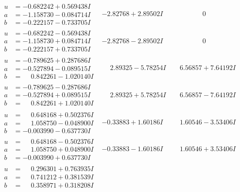 \documentclass[1p]{elsarticle_modified}
\theoremstyle{definition}
\begin{document}
$$\begin{array}{c|c|c}
\begin{aligned}
u &= -0.682242 + 0.569438 I \\
a &= -1.158730 - 0.084714 I \\
b &= -0.222157 - 0.733705 I\end{aligned}
 & -2.82768 + 2.89502 I & \phantom{-0.000000 } 0 \\ \hline\begin{aligned}
u &= -0.682242 - 0.569438 I \\
a &= -1.158730 + 0.084714 I \\
b &= -0.222157 + 0.733705 I\end{aligned}
 & -2.82768 - 2.89502 I & \phantom{-0.000000 } 0 \\ \hline\begin{aligned}
u &= -0.789625 + 0.287686 I \\
a &= -0.527894 - 0.089515 I \\
b &= \phantom{-}0.842261 - 1.020140 I\end{aligned}
 & \phantom{-}2.89325 - 5.78254 I & \phantom{-}6.56857 + 7.64192 I \\ \hline\begin{aligned}
u &= -0.789625 - 0.287686 I \\
a &= -0.527894 + 0.089515 I \\
b &= \phantom{-}0.842261 + 1.020140 I\end{aligned}
 & \phantom{-}2.89325 + 5.78254 I & \phantom{-}6.56857 - 7.64192 I \\ \hline\begin{aligned}
u &= \phantom{-}0.648168 + 0.502376 I \\
a &= \phantom{-}1.058750 - 0.048900 I \\
b &= -0.003990 - 0.637730 I\end{aligned}
 & -0.33883 + 1.60186 I & \phantom{-}1.60546 - 3.53406 I \\ \hline\begin{aligned}
u &= \phantom{-}0.648168 - 0.502376 I \\
a &= \phantom{-}1.058750 + 0.048900 I \\
b &= -0.003990 + 0.637730 I\end{aligned}
 & -0.33883 - 1.60186 I & \phantom{-}1.60546 + 3.53406 I \\ \hline\begin{aligned}
u &= \phantom{-}0.296301 + 0.763935 I \\
a &= \phantom{-}0.741212 + 0.381539 I \\
b &= \phantom{-}0.358971 + 0.318208 I\end{aligned}

\end{array}$$
\end{document}
